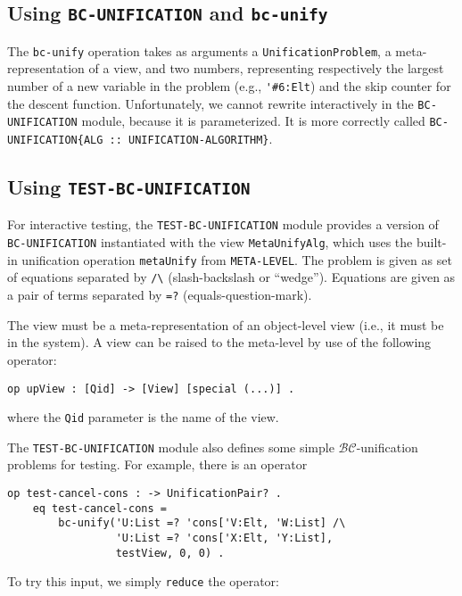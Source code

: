 \documentclass[11pt]{article}
\newcommand{\BC}{\mathcal{BC}}
\begin{document}
\subsection{Using \lstinline|BC-UNIFICATION| and \lstinline|bc-unify|}
\label{subappendix:using-bc-unif-mod}

The \lstinline|bc-unify| operation takes as arguments a
\lstinline|UnificationProblem|, a meta-representation of a view, and two
numbers, representing respectively the largest number of a new variable in the
problem (e.g., \lstinline|'#6:Elt|) and the skip counter for the descent
function. Unfortunately, we cannot rewrite interactively in the
\lstinline|BC-UNIFICATION| module, because it is parameterized. It is more
correctly called \lstinline|BC-UNIFICATION{ALG :: UNIFICATION-ALGORITHM}|.

\subsection{Using \lstinline|TEST-BC-UNIFICATION|}
\label{subappendix:using-bc-test-mod}

For interactive testing, the \lstinline|TEST-BC-UNIFICATION| module provides a
version of \lstinline|BC-UNIFICATION| instantiated with the view
\lstinline|MetaUnifyAlg|, which uses the built-in unification operation
\lstinline|metaUnify| from \lstinline|META-LEVEL|. The problem is given as
set of equations separated by \lstinline|/\| (slash-backslash or ``wedge'').
Equations are given as a pair of terms separated by \lstinline|=?|
(equals-question-mark).

The view must be a meta-representation of an object-level view (i.e., it must
be in the system). A view can be raised to the meta-level by use of the
following operator:
\begin{lstlisting}[language=Maude, style=smalllisting]
    op upView : [Qid] -> [View] [special (...)] .
\end{lstlisting}
where the \lstinline|Qid| parameter is the name of the view.
\vspace{1ex}



The \lstinline|TEST-BC-UNIFICATION| module also defines some simple
$\BC$-unification problems for testing. For example, there is an operator
\begin{lstlisting}[language=Maude, style=smalllisting]
    op test-cancel-cons : -> UnificationPair? .
    eq test-cancel-cons =
        bc-unify('U:List =? 'cons['V:Elt, 'W:List] /\
                 'U:List =? 'cons['X:Elt, 'Y:List],
                 testView, 0, 0) .
\end{lstlisting}
To try this input, we simply \lstinline|reduce| the operator:
\vspace{1ex}
\end{document}
